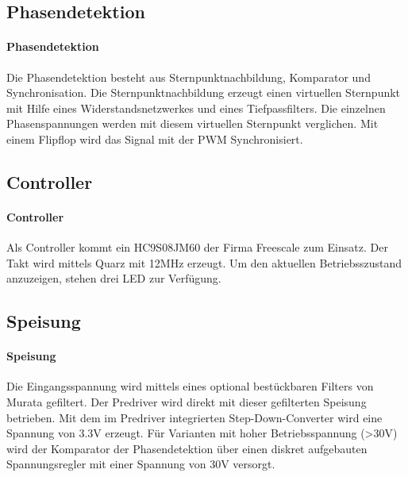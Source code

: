 \ifSTANDALONE
\subsection{Phasendetektion}
\fi
\ifEMBED
\paragraph{Phasendetektion}$~~$\vspace{2mm}\\
\fi
Die Phasendetektion besteht aus Sternpunktnachbildung, Komparator und 
Synchronisation. Die Sternpunktnachbildung erzeugt einen virtuellen Sternpunkt 
mit Hilfe eines Widerstandsnetzwerkes und eines Tiefpassfilters. Die einzelnen 
Phasenspannungen werden mit diesem virtuellen Sternpunkt verglichen. Mit einem 
Flipflop wird das Signal mit der PWM Synchronisiert. 

\ifSTANDALONE
\subsection{Controller}
\fi
\ifEMBED
\paragraph{Controller}$~~$\vspace{2mm}\\
\fi
Als Controller kommt ein HC9S08JM60 der Firma Freescale zum Einsatz. Der Takt 
wird mittels Quarz mit 12MHz erzeugt. Um den aktuellen Betriebsszustand 
anzuzeigen, stehen drei LED zur Verfügung. 

\ifSTANDALONE
\subsection{Speisung}
\fi
\ifEMBED
\paragraph{Speisung}$~~$\vspace{2mm}\\
\fi
Die Eingangsspannung wird mittels eines optional bestückbaren Filters von 
Murata gefiltert. Der Predriver wird direkt mit dieser gefilterten Speisung 
betrieben. Mit dem im Predriver integrierten Step-Down-Converter wird eine 
Spannung von 3.3V erzeugt. Für Varianten mit hoher Betriebsspannung (>30V) 
wird der Komparator der Phasendetektion über einen diskret aufgebauten 
Spannungsregler mit einer Spannung von 30V versorgt. 

